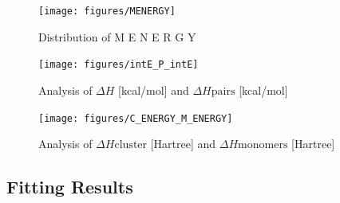 \documentclass[journal=jacsat,manuscript=article]{achemso}
\begin{document}
\begin{figure}
    \centering
    \texttt{[image: figures/MENERGY]}
    \caption{ Distribution of  M E N E R G Y }
    \label{fig:singlekey}
\end{figure}

\begin{figure}
    \centering
    \texttt{[image: figures/intE\_P\_intE]}
    \caption{ Analysis of $\Delta H$ [kcal/mol] and $\Delta H{\mathrm{pairs}}$ [kcal/mol] }
    \label{fig:_intE_P_intE}
\end{figure}

\begin{figure}
    \centering
    \texttt{[image: figures/C\_ENERGY\_M\_ENERGY]}
    \caption{ Analysis of $\Delta H{\mathrm{cluster}}$ [Hartree] and $\Delta H{\mathrm{monomers}}$ [Hartree] }
    \label{fig:_C_ENERGY_M_ENERGY}
\end{figure}
\newpage 
 \subsection{Fitting Results}
\end{document}
